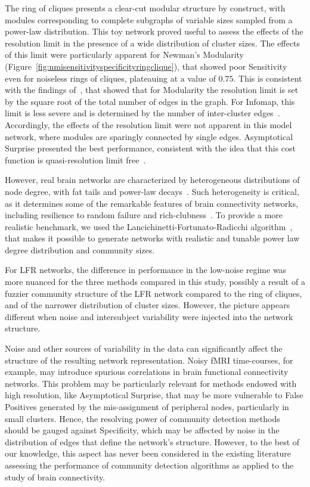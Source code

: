 The ring of cliques presents a clear-cut modular structure by construct, with modules corresponding to complete subgraphs of variable sizes sampled from a power-law distribution. 
This toy network proved useful to assess the effects of the resolution limit in the presence of a wide distribution of cluster sizes. The effects of this limit were particularly apparent for Newman's Modularity (Figure~\ref{fig:nmisensitivityspecificityringclique}), that showed poor Sensitivity even for noiseless rings of cliques, plateauing at a value of $0.75$.
This is consistent with the findings of~\cite{fortunato2007}, that showed that for Modularity the resolution limit is set by the square root of the total number of edges in the graph.
For Infomap, this limit is less severe and is determined by the number of inter-cluster edges~\cite{kawamoto2015}. Accordingly, the effects of the resolution limit were not apparent in this model network, where modules are sparingly connected by single edges.
Asymptotical Surprise presented the best performance, consistent with the idea that this cost function is quasi-resolution limit free~\cite{traag2015}.

However, real brain networks are characterized by heterogeneous distributions of node degree, with fat tails and power-law decays~\cite{bullmore2009}. Such heterogeneity is critical, as it determines some of the remarkable features of brain connectivity networks, including resilience to random failure and rich-clubness~\cite{vandenheuvel2011,vandenheuvel2013a}. To provide a more realistic benchmark, we used the Lancichinetti-Fortunato-Radicchi algorithm~\cite{lancichinetti2008}, that makes it possible to generate networks with realistic and tunable power law degree distribution and community sizes.

For LFR networks, the difference in performance in the low-noise regime was more nuanced for the three methods compared in this study, possibly a result of a fuzzier community structure of the LFR network compared to the ring of cliques, and of the narrower distribution of cluster sizes. However, the picture appears different when noise and intersubject variability were injected into the network structure.

Noise and other sources of variability in the data can significantly affect the structure of the resulting network representation.
Noisy fMRI time-courses, for example, may introduce spurious correlations in brain functional connectivity networks.
This problem may be particularly relevant for methods endowed with high resolution, like Asymptotical Surprise, that may be more vulnerable to False Positives generated by the mis-assignment of peripheral nodes, particularly in small clusters. Hence, the resolving power of community detection methods should be gauged against Specificity, which may be affected by noise in the distribution of edges that define the network's structure.
However, to the best of our knowledge, this aspect has never been considered in the existing literature assessing the performance of community detection algorithms as applied to the study of brain connectivity.

